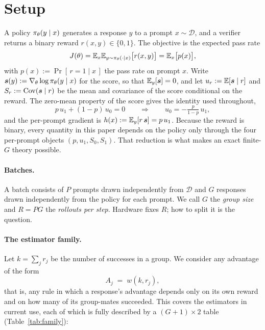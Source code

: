 \section{Setup}
\label{sec:setup}

A policy $\pi_{\theta}(y \mid x)$ generates a response $y$ to a prompt $x \sim \mathcal{D}$, and a
verifier returns a binary reward $r(x,y) \in \{0,1\}$. The objective is the expected pass rate
\begin{equation}
  J(\theta) = \mathbb{E}_{x} \mathbb{E}_{y \sim \pi_{\theta}(\cdot \mid x)}\big[ r(x,y) \big] = \mathbb{E}_{x}\big[ p(x) \big],
\end{equation}
with $p(x) := \Pr[\, r = 1 \mid x \,]$ the pass rate on prompt $x$.
Write $\bm{s}(y) := \nabla_\theta \log \pi_{\theta}(y \mid x)$ for the score, so that
$\mathbb{E}_{y}[\bm{s}] = 0$, and let $u_r := \mathbb{E}[\bm{s} \mid r]$ and $S_r := \operatorname{Cov}(\bm{s} \mid r)$ be the
mean and covariance of the score conditional on the reward. The zero-mean property of the score
gives the identity used throughout,
\begin{equation}
  \label{eq:score-identity}
  p\,u_1 + (1-p)\,u_0 = 0
  \qquad\Longrightarrow\qquad
  u_0 = -\tfrac{p}{1-p}\, u_1 ,
\end{equation}
and the per-prompt gradient is $h(x) := \mathbb{E}_y[r\,\bm{s}] = p\, u_1$. Because the reward is binary,
every quantity in this paper depends on the policy only through the four per-prompt objects
$(p, u_1, S_0, S_1)$. That reduction is what makes an exact finite-$G$ theory possible.

\paragraph{Batches.} A batch consists of $P$ prompts drawn independently from $\mathcal{D}$ and $G$
responses drawn independently from the policy for each prompt. We call $G$ the \emph{group size}
and $R = PG$ the \emph{rollouts per step}. Hardware fixes $R$; how to split it is the question.

\paragraph{The estimator family.} Let $k = \sum_{j} r_j$ be the number of successes in a group. We
consider any advantage of the form
\begin{equation}
  \label{eq:family}
  A_j \;=\; w(k, r_j),
\end{equation}
that is, any rule in which a response's advantage depends only on its own reward and on how many
of its group-mates succeeded. This covers the estimators in current use, each of which is fully
described by a $(G+1) \times 2$ table (Table~\ref{tab:family}):

